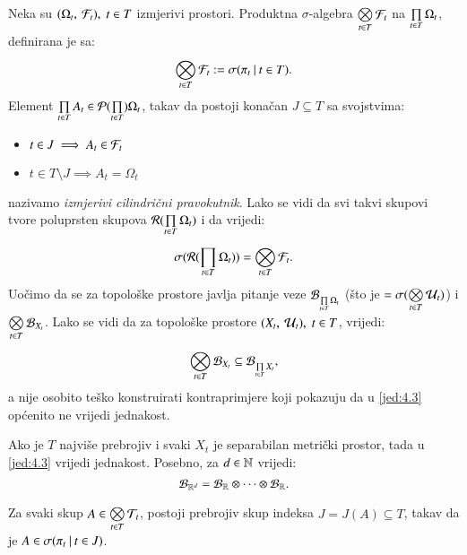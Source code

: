 Neka su $(\Omega_t, \: \mathcal{F}_t), \; t \in T$ izmjerivi prostori.
Produktna $\sigma$-algebra $\bigotimes\limits_{t \in T}^{} \mathcal{F}_t$ na $\prod\limits_{t \in T}^{} \Omega_t$, definirana je sa:
\begin{equation}    \label{jed:4.1}
    \bigotimes\limits_{t \in T}^{} \mathcal{F}_t := \sigma({\pi_t} \: | \: {t \in T}).
\end{equation} 
Element $\prod\limits_{t \in T}^{} A_t \in \mathcal{P}({\prod\limits_{t \in T}^{}}) \Omega_t$, takav da postoji kona\v can $J \subseteq T$ sa svojstvima:
\begin{itemize}[label=]
    \item $t \in J \implies A_t \in \mathcal{F}_t$
    \item $ t \in T \setminus J \implies A_t = \Omega_t $
\end{itemize}
nazivamo \emph{izmjerivi cilindri\v cni pravokutnik}.
Lako se vidi da svi takvi skupovi tvore poluprsten skupova $\mathcal{R}({\prod\limits_{t \in T}^{} \Omega_t})$ i da vrijedi:
\begin{equation}    \label{jed:4.2}
    \sigma({\mathcal{R}({\prod\limits_{t \in T}^{} \Omega_t})}) = \bigotimes\limits_{t \in T}^{} \mathcal{F}_t.
\end{equation}
Uo\v cimo da se za topolo\v ske prostore javlja pitanje veze $\mathcal{B}_{\prod\limits_{t \in T}^{} \Omega_t}$ (\v sto je $= \sigma({\bigotimes\limits_{t \in T}^{} \mathcal{U}_t})$) i $\bigotimes\limits_{t \in T}^{} \mathcal{B}_{X_t}$.
Lako se vidi da za topolo\v ske prostore $(X_t, \: \mathcal{U}_t), \; t \in T$, vrijedi:
\begin{equation}    \label{jed:4.3}
    \bigotimes\limits_{t \in T}^{} \mathcal{B}_{X_t} \subseteq \mathcal{B}_{\prod\limits_{t \in T}^{} X_t},
\end{equation}
a nije osobito te\v sko konstruirati kontraprimjere koji pokazuju da u \eqref{jed:4.3} op\' cenito ne vrijedi jednakost.

\begin{zad} \label{zad:4.4}
    Ako je $T$ najvi\v se prebrojiv i svaki $X_t$ je separabilan metri\v cki prostor, tada u \eqref{jed:4.3} vrijedi jednakost.
    Posebno, za $d \in \mathbb{N}$ vrijedi:
    \begin{equation}    \label{jed:4.5}
        \mathcal{B}_{\mathbb{R}^d} = \mathcal{B}_{\mathbb{R}} \otimes \dots \otimes \mathcal{B}_{\mathbb{R}}.
    \end{equation}
\end{zad}

\begin{zad} \label{zad:4.6}
    Za svaki skup $A \in \bigotimes\limits_{t \in T}^{} \mathcal{T}_t$, postoji prebrojiv skup indeksa $J = J(A) \subseteq T$, takav da je $A \in \sigma({\pi_t} \: | \: {t \in J})$. 
\end{zad}

